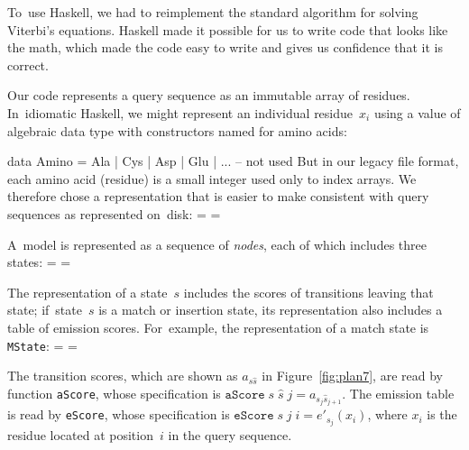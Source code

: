 \documentclass[]{jfp1}
\newcommand\txprobxj[3][]{a#1_{{#2}_{j}{#3}_{j+1}}}  %
\newcommand\figref[1]{Figure~\ref{fig:#1}}
\newcommand\seclabel[1]{\label{sec:#1}}
\newif\ifverbatimsmall
\newenvironment{smallverbatim}{\par\small\verbatimsmalltrue\verbatim}{\endverbatim}
\newcommand\smallverbatiminput[1]{%
  \verbatimsmalltrue
  \presvtopsep=\topsep
  \topsep=0.78\topsep
  \verbatimsmallfalse
  \topsep=\presvtopsep
}
\begin{document}
To~use Haskell, we had to reimplement the standard
algorithm for solving Viterbi's equations.
Haskell made it possible for us to write code that looks like the
math,
which made the code easy to write and gives us confidence that it is
correct.

\ifpagetuning\enlargethispage{1.2\baselineskip}\fi

Our code represents a query sequence as an immutable array of residues.
In~idiomatic Haskell, 
we might represent an individual residue~$x_i$
using a value of algebraic data type with constructors named for
amino acids:
\begin{smallverbatim}
data Amino = Ala | Cys | Asp | Glu | ...   -- not used
\end{smallverbatim}
But in our
legacy file format, each amino acid (residue) is a small integer
used only to index arrays.
We therefore chose a representation that is easier to make consistent
with query sequences as represented on~disk:
\smallverbatiminput{aa}




A~model is represented as a sequence of \emph{nodes}, 
each of which includes three states:\label{code:model3-node}
\smallverbatiminput{model3-node}
The representation of a state~$s$ includes the scores of transitions leaving
that state;
if~state~$s$ is a match or insertion state, its representation also
includes a table of emission scores.
For~example, the representation of a match state is \texttt{MState}:
\smallverbatiminput{model3-mstate}
%
The transition scores, which are shown as $a_{s\hat s}$
in \figref{plan7}, are read by  
function \texttt{aScore}, 
whose
specification is
\mbox{$\mathtt{aScore}\;s\;\hat s\;j = \txprobxj s {\hat s}$}.\seclabel{aScore}
The
emission table is read by 
\texttt{eScore}, whose specification
is %
\mbox{$\mathtt{eScore}\;s\;j\;i = e'_{s_j}(x_i)$},
where $x_i$ is the residue located at position~$i$ in the query
sequence. 
%
\end{document}
